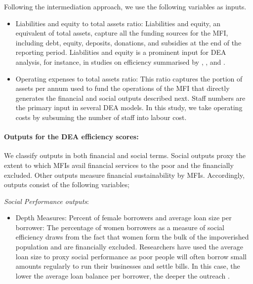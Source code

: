 \documentclass[a4paper, nobind]{templates/ociamthesis}
\providecommand{\tightlist}{%
  \setlength{\itemsep}{0pt}\setlength{\parskip}{0pt}}
\begin{document}
Following the intermediation approach, we use the following variables as inputs.

\begin{itemize}
\item
  Liabilities and equity to total assets ratio: Liabilities and equity, an equivalent of total assets, capture all the funding sources for the MFI, including debt, equity, deposits, donations, and subsidies at the end of the reporting period. Liabilities and equity is a prominent input for DEA analysis, for instance, in studies on efficiency summarised by \textcite{fethi2010assessing}, \textcite{paradi2017data}, and \textcite{fall2018dea}.
\item
  Operating expenses to total assets ratio: This ratio captures the portion of assets per annum used to fund the operations of the MFI that directly generates the financial and social outputs described next. Staff numbers are the primary input in several DEA models. In this study, we take operating costs by subsuming the number of staff into labour cost.
\end{itemize}

\hypertarget{outputs-for-the-dea-efficiency-scores}{%
\paragraph{Outputs for the DEA efficiency scores:}\label{outputs-for-the-dea-efficiency-scores}}

We classify outputs in both financial and social terms. Social outputs proxy the extent to which MFIs avail financial services to the poor and the financially excluded. Other outputs measure financial sustainability by MFIs. Accordingly, outputs consist of the following variables;

\emph{Social Performance outputs}:

\begin{itemize}
\tightlist
\item
  Depth Measures: Percent of female borrowers and average loan size per borrower: The percentage of women borrowers as a measure of social efficiency draws from the fact that women form the bulk of the impoverished population and are financially excluded. Researchers have used the average loan size to proxy social performance as poor people will often borrow small amounts regularly to run their businesses and settle bills. In this case, the lower the average loan balance per borrower, the deeper the outreach \autocite{d2017ngos}.
\end{itemize}
\end{document}
